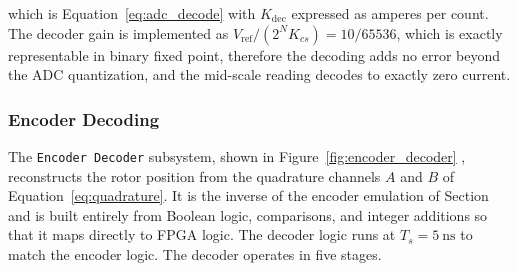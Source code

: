 which is Equation~\eqref{eq:adc_decode} with $K_{\mathrm{dec}}$ expressed as amperes per count. The decoder gain is implemented as $V_{\mathrm{ref}}/(2^{N} K_{cs}) = 10/65536$, which is exactly representable in binary fixed point, therefore the decoding adds no error beyond the ADC quantization, and the mid-scale reading decodes to exactly zero current.

\subsubsection{Encoder Decoding}\label{sec:encoderDecoding}

The \texttt{Encoder Decoder} subsystem, shown in Figure~\ref{fig:encoder_decoder} %
, reconstructs the rotor position from the quadrature channels $A$ and $B$ of Equation~\eqref{eq:quadrature}. It is the inverse of the encoder emulation of Section~ and is built entirely from Boolean logic, comparisons, and integer additions so that it maps directly to FPGA logic. The decoder logic runs at $T_s = \SI{5}{\nano\second}$ to match the encoder logic. The decoder operates in five stages.

